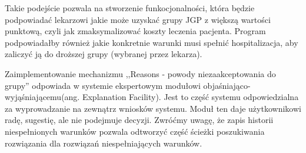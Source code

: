 Takie podejście pozwala na stworzenie funkocjonalności, która będzie podpowiadać lekarzowi jakie może uzyskać grupy JGP z większą wartości punktową, czyli jak zmaksymalizować koszty leczenia pacjenta. Program podpowiadałby również jakie konkretnie warunki musi spełnić hospitalizacja, aby zaliczyć ją do droższej grupy (wybranej przez lekarza).

Zaimplementowanie mechanizmu ,,Reasons - powody niezaakceptowania do grupy'' odpowiada w systemie ekspertowym modułowi objaśniająco-wyjąśniającemu(ang. Explanation Facility). Jest to część systemu odpowiedzialna za wyprowadzanie na zewnątrz wniosków systemu. Moduł ten daje użytkownikowi radę, sugestię, ale nie podejmuje decyzji. Zwróćmy uwagę, że zapis historii niespełnionych warunków pozwala odtworzyć część ścieżki poszukiwania rozwiązania dla rozwiązań niespełniających warunków.
